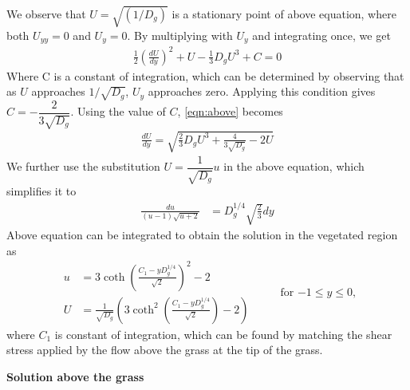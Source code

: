 \documentclass[letterpaper,10pt]{article}
\begin{document}
\noindent
We observe that $U = \sqrt{(1/D_g)}$ is a stationary point of above equation, where both $U_{yy}=0$ and $U_y =0 $. By multiplying with $U_y$ and integrating once, we get
\begin{equation}
\begin{split}
 \frac{1}{2} \left( \frac{dU}{dy} \right)^2 +U - \frac{1}{3} D_g U^3 + C = 0
\end{split}
\label{eqn:above}
\end{equation}
Where C is a constant of integration, which can be determined by observing that as $U$ approaches $1/\sqrt{D_g}$, $U_y$ approaches zero. Applying this condition gives $C = -\dfrac{2}{3\sqrt{D_g}}$. Using the value of $C$, \eqref{eqn:above} becomes 
\begin{equation}
\begin{split}
 \frac{dU}{dy} = \sqrt{\frac{2}{3}D_g U^3+\frac{4}{3\sqrt{D_g}}-2U }
\end{split}
\end{equation}
We further use the substitution $U=\dfrac{1}{\sqrt{D_g}} u $ in the above equation, which simplifies it to
\begin{equation}
\begin{split}
 \frac{du}{(u-1)\sqrt{u+2} } &= {D_g^{1/4}}\sqrt{\frac{2}{3}} dy
\end{split}
\end{equation}
Above equation can be integrated to obtain the solution in the vegetated region as
\begin{equation}
\begin{split}
u &= 3 \coth \left(\frac{C_1-y D_g^{1/4}}{\sqrt{2}}  \right)^2-2 \\
U &= \frac{1}{\sqrt{D_g}} \left( 3 \coth^2 \left(\frac{C_1-y D_g^{1/4}}{\sqrt{2}}  \right)-2    \right)
\label{under_grass_sol}
\end{split}
 \hspace{1cm} \text{for $-1\le y\le 0$,}
\end{equation}
where $C_1$ is constant of integration, which can be found by matching the shear stress applied by the flow above the grass at the tip of the grass.

\vspace{2mm}
\noindent
\textbf{Solution above the grass}
\end{document}
